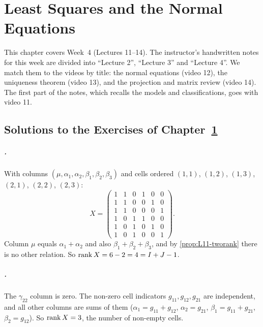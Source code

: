 \chapter{Least Squares and the Normal Equations}\label{ch:week04}

This chapter covers Week~4 (Lectures 11--14). The instructor's handwritten notes for this week
are divided into ``Lecture 2'', ``Lecture 3'' and ``Lecture 4''. We match them to the videos by
title: the normal equations (video 12), the uniqueness theorem (video 13), and the projection
and matrix review (video 14). The first part of the notes, which recalls the models and
classifications, goes with video 11.






\section*{Solutions to the Exercises of Chapter~\ref{ch:week04}}

\paragraph{.}
With columns $(\mu,\alpha_1,\alpha_2,\beta_1,\beta_2,\beta_3)$ and cells ordered $(1,1)$, $(1,2)$, $(1,3)$, $(2,1)$, $(2,2)$, $(2,3)$:
\[
X=\begin{pmatrix}1&1&0&1&0&0\\1&1&0&0&1&0\\1&1&0&0&0&1\\1&0&1&1&0&0\\1&0&1&0&1&0\\1&0&1&0&0&1\end{pmatrix}.
\]
Column $\mu$ equals $\alpha_1+\alpha_2$ and also $\beta_1+\beta_2+\beta_3$, and by \cref{prop:L11-tworank} there is no
other relation. So $\operatorname{rank} X=6-2=4=I+J-1$.

\paragraph{.}
The $\gamma_{22}$ column is zero. The non-zero cell indicators $g_{11},g_{12},g_{21}$ are independent, and all other
columns are sums of them ($\alpha_1=g_{11}+g_{12}$, $\alpha_2=g_{21}$, $\beta_1=g_{11}+g_{21}$, $\beta_2=g_{12}$). So
$\operatorname{rank} X=3$, the number of non-empty cells.

